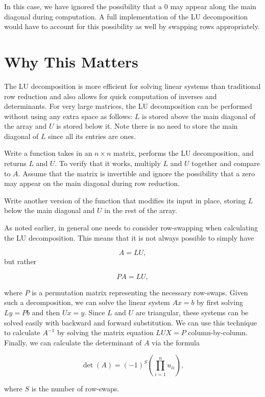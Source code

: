 In this case, we have ignored the possibility that a 0 may appear along the main diagonal during computation. A full implementation of the LU decomposition would have to account for this possibility as well by swapping rows appropriately.

\section*{Why This Matters}
The LU decomposition is more efficient for solving linear systems than traditional row reduction and also allows for quick computation of inverses and determinants. For very large matrices, the LU decomposition can be performed without using any extra space as follows: $L$ is stored above the main diagonal of the array and $U$ is  stored below it.
Note there is no need to store the main diagonal of $L$ since all its entries are ones.

\begin{problem}
\label{prob:LU}
Write a function takes in an $n\times n$ matrix, performs the LU decomposition, and returns $L$ and $U$.
To verify that it works, multiply $L$ and $U$ together and compare to $A$.
Assume that the matrix is invertible and ignore the possibility that a zero may appear on the main diagonal during row reduction.

Write another version of the function that modifies its input in place, storing $L$ below the main diagonal and $U$ in the rest of the array.
\end{problem}

As noted earlier, in general one needs to consider row-swapping when
calculating the LU decomposition. This means that it is not always possible to simply have

\[
A = LU,
\]
but rather

\[
PA = LU,
\]

where $P$ is a permutation matrix representing the necessary row-swaps. Given such a decomposition, we can solve the linear system $Ax = b$ by
first solving $Ly = Pb$ and then $Ux = y$. Since $L$ and $U$ are triangular, these systems can be solved easily with backward and forward substitution. We can use this technique to calculate $A^{-1}$ by solving the matrix equation $LUX = P$ column-by-column. Finally, we can calculate the determinant of $A$ via the formula

\[
\det(A) = (-1)^S\left(\displaystyle\prod_{i=1}^nu_{ii}\right),
\]

where $S$ is the number of row-swaps.

